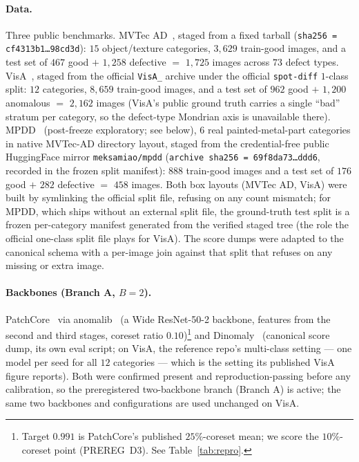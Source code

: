 \documentclass[preprint,11pt]{elsarticle}
\begin{document}
\paragraph{Data.} Three public benchmarks. MVTec AD~\citep{bergmann2019mvtec}, staged from a fixed
tarball (\texttt{sha256\,=\,cf4313b1\allowbreak\ldots98cd3d}): $15$ object/texture categories, $3{,}629$
train-good images, and a test set of $467$ good $+$ $1{,}258$ defective $=$ $1{,}725$ images
across $73$ defect types. VisA~\citep{zou2022spot}, staged from the official
\texttt{VisA\_} archive under the official \texttt{spot-diff} $1$-class split:
$12$ categories, $8{,}659$ train-good images, and a test set of $962$ good
$+$ $1{,}200$ anomalous $=$ $2{,}162$ images (VisA's public ground truth carries a single
``bad'' stratum per category, so the defect-type Mondrian axis is unavailable there). MPDD~\citep{jezek2021mpdd}
(post-freeze exploratory; see below), $6$ real painted-metal-part categories in native MVTec-AD
directory layout, staged from the credential-free public HuggingFace mirror \texttt{meksamiao/mpdd}
(\texttt{archive\ sha256\,=\,69f8da73\allowbreak\ldots ddd6}, recorded in the frozen split manifest):
$888$ train-good images and a test set of $176$ good $+$ $282$ defective $=$ $458$ images. Both box
layouts (MVTec AD, VisA) were built by symlinking the official split file,
refusing on any count mismatch; for MPDD, which ships without an external split file, the ground-truth
test split is a frozen per-category manifest generated from the verified staged tree (the role
the official one-class split file plays for VisA). The score dumps were adapted to the canonical schema with a
per-image join against that split that refuses on any missing or extra image.
\paragraph{Backbones (Branch A, $B=2$).} PatchCore~\citep{roth2022patchcore} via
anomalib~\citep{akcay2022anomalib} (a Wide ResNet-50-2 backbone, features from the second and
third stages, coreset ratio $0.10$)\footnote{Target $0.991$ is PatchCore's published
$25\%$-coreset mean; we score the $10\%$-coreset point (PREREG~D3).
See Table~\ref{tab:repro}.} and Dinomaly~\citep{guo2025dinomaly} (canonical score dump,
its own eval script; on VisA, the reference repo's multi-class setting --- one model per seed for
all $12$ categories --- which is the setting its published VisA figure reports). Both were
confirmed present and reproduction-passing before any calibration, so the preregistered
two-backbone branch (Branch A) is active; the same two backbones and configurations are used
unchanged on VisA.
\end{document}
